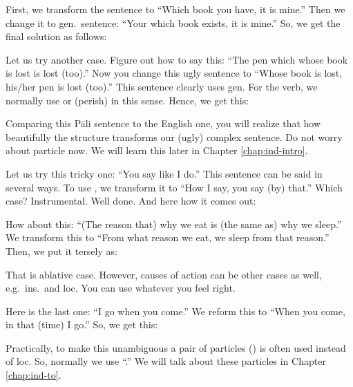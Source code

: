 First, we transform the sentence to ``Which book you have, it is mine.''  Then we change it to gen.\ sentence: ``Your which book exists, it is mine.'' So, we get the final solution as follows:


Let us try another case. Figure out how to say this: ``The pen which whose book is lost is lost (too).'' Now you change this ugly sentence to ``Whose book is lost, his/her pen is lost (too).'' This sentence clearly uses gen. For the verb, we normally use  or  (perish) in this sense. Hence, we get this:


Comparing this P\=ali sentence to the English one, you will realize that how beautifully the  structure transforms our (ugly) complex sentence. Do not worry about particle  now. We will learn this later in Chapter \ref{chap:ind-intro}.

Let us try this tricky one: ``You say like I do.'' This sentence can be said in several ways. To use , we transform it to ``How I say, you say (by) that.'' Which case? Instrumental. Well done. And here how it comes out:


How about this: ``(The reason that) why we eat is (the same as) why we sleep.'' We transform this to ``From what reason we eat, we sleep from that reason.'' Then, we put it tersely as:


That is ablative case. However, causes of action can be other cases as well, e.g.\ ins.\ and loc. You can use whatever you feel right.

Here is the last one: ``I go when you come.'' We reform this to ``When you come, in that (time) I go.'' So, we get this:


Practically, to make this unambiguous a pair of particles () is often used instead of loc. So, normally we use ``.'' We will talk about these particles in Chapter \ref{chap:ind-to}.

